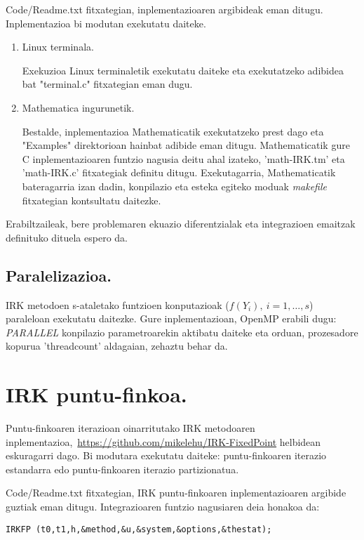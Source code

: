Code/Readme.txt fitxategian, inplementazioaren argibideak eman ditugu. Inplementazioa bi modutan exekutatu daiteke.

\begin{enumerate}
\item Linux terminala.

Exekuzioa Linux terminaletik exekutatu daiteke eta exekutatzeko adibidea bat  "terminal.c" fitxategian eman dugu. 

\item Mathematica ingurunetik.

Bestalde, inplementazioa Mathematicatik exekutatzeko prest dago eta "Examples" direktorioan hainbat adibide eman ditugu. Mathematicatik gure C inplementazioaren funtzio nagusia deitu ahal izateko, 'math-IRK.tm' eta 'math-IRK.c' fitxategiak definitu ditugu. Exekutagarria, Mathematicatik bateragarria izan dadin, konpilazio eta esteka egiteko moduak \emph{makefile} fitxategian kontsultatu daitezke.    

\end{enumerate}

Erabiltzaileak, bere problemaren ekuazio diferentzialak eta integrazioen emaitzak definituko dituela espero da. 

\subsection*{Paralelizazioa.}

IRK metodoen s-ataletako funtzioen konputazioak ($f(Y_i), \ i=1,\dots,s$) paraleloan exekutatu daitezke. Gure inplementazioan, OpenMP erabili dugu:  \emph{PARALLEL} konpilazio parametroarekin aktibatu daiteke eta orduan, prozesadore kopurua 'threadcount' aldagaian, zehaztu behar da. 


\section{IRK puntu-finkoa.}

Puntu-finkoaren iterazioan oinarritutako IRK metodoaren inplementazioa,~\url{https://github.com/mikelehu/IRK-FixedPoint} helbidean eskuragarri dago. Bi modutara exekutatu daiteke: puntu-finkoaren iterazio estandarra edo puntu-finkoaren iterazio partizionatua. 

Code/Readme.txt fitxategian, IRK puntu-finkoaren inplementazioaren argibide guztiak eman ditugu. Integrazioaren funtzio nagusiaren deia honakoa da:   
\begin{lstlisting}
IRKFP (t0,t1,h,&method,&u,&system,&options,&thestat);
\end{lstlisting}


